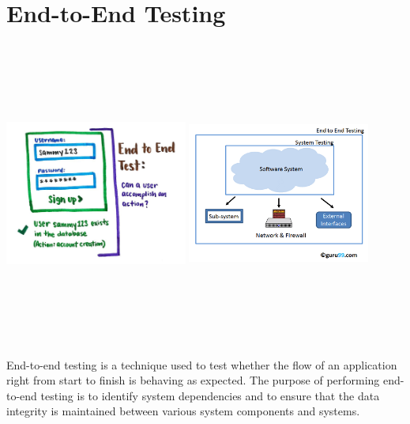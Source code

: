 \section{End-to-End Testing}
\begin{center}
    \includegraphics[width=6cm,height=10cm,keepaspectratio]{images/e2e_1}
    \includegraphics[width=6cm,height=10cm,keepaspectratio]{images/e2e_2}
\end{center}

End-to-end testing is a technique used to test whether the flow of an 
application right from start to finish is behaving as expected. The purpose of 
performing end-to-end testing is to identify system dependencies and to ensure
that the data integrity is maintained between various system components and 
systems.

